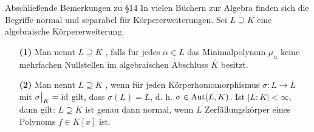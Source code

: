 \begin{generic_no_num}{Abschließende Bemerkungen zu §14}
	In vielen Büchern zur Algebra finden sich die Begriffe normal und separabel für Körpererweiterungen. Sei $L\supseteq K$ eine algebraische Körpererweiterung.
	\begin{itemize}
		\item[\textbf{(1)}]
		Man nennt $L\supseteq K$ , falls für jedes $\alpha\in L$ das Minimalpolynom $\mu_\alpha$ keine mehrfachen Nullstellen im algebraischen Abschluss $\overline{K}$ besitzt.
		\item[\textbf{(2)}]
		Man nennt $L\supseteq K$ , wenn für jeden Körperhomomorphismus $\sigma: L\to\overline{L}$ mit $\sigma\big|_K=\operatorname{id}$ gilt, dass $\sigma(L)=L$, d. h. $\sigma\in\operatorname{Aut}(L,K)$. Ist $|L:K|<\infty$, dann gilt: $L\supseteq K$ ist genau dann normal, wenn $L$ Zerfällungskörper eines Polynoms $f\in K[x]$ ist.
	\end{itemize}
\end{generic_no_num}